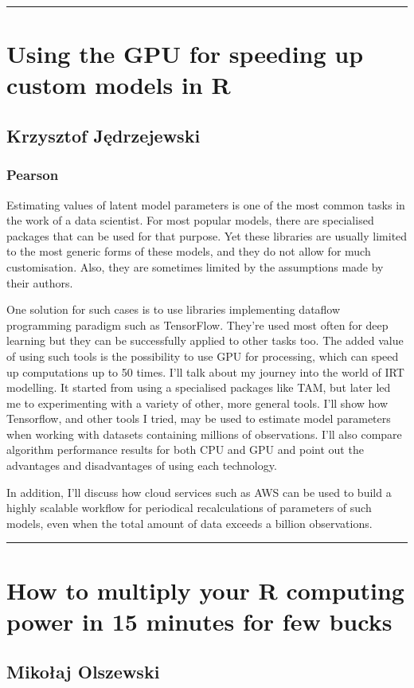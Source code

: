\documentclass [12pt]{article}
\begin{document}
\noindent\rule{\textwidth}{1pt}
\section{Using the GPU for speeding up custom models in R}
\subsection*{Krzysztof	Jędrzejewski}
\subsubsection*{Pearson}

Estimating values of latent model parameters is one of the most common tasks in the work of a data scientist. For most popular models, there are specialised packages that can be used for that purpose. Yet these libraries are usually limited to the most generic forms of these models, and they do not allow for much customisation. Also, they are sometimes limited by the assumptions made by their authors.

One solution for such cases is to use libraries implementing dataflow programming paradigm such as TensorFlow. They’re used most often for deep learning but they can be successfully applied to other tasks too. The added value of using such tools is the possibility to use GPU for processing, which can speed up computations up to 50 times. I’ll talk about my journey into the world of IRT modelling. It started from using a specialised packages like TAM, but later led me to experimenting with a variety of other, more general tools. I’ll show how Tensorflow, and other tools I tried, may be used to estimate model parameters when working with datasets containing millions of observations. I’ll also compare algorithm performance results for both CPU and GPU and point out the advantages and disadvantages of using each technology.

In addition, I’ll discuss how cloud services such as AWS can be used to build a highly scalable workflow for periodical recalculations of parameters of such models, even when the total amount of data exceeds a billion observations.

\noindent\rule{\textwidth}{1pt}
\section{How to multiply your R computing power in 15 minutes for few bucks}
\subsection*{Mikołaj	Olszewski}
\end{document}
